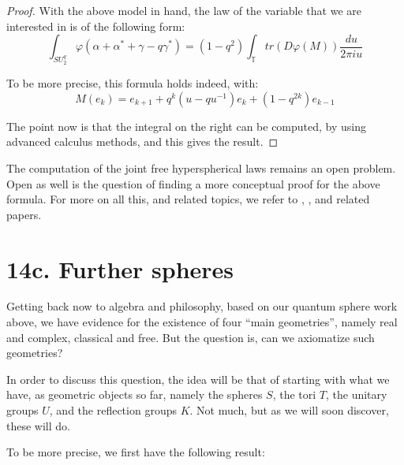 \documentclass[12pt]{amsbook}
\begin{document}
\begin{proof}
With the above model in hand, the law of the variable that we are interested in is of the following form:
$$\int_{SU^q_2}\varphi(\alpha+\alpha^*+\gamma-q\gamma^*)=(1-q^2)\int_{\mathbb T}tr(D\varphi(M))\frac{du}{2\pi iu}$$

To be more precise, this formula holds indeed, with:
$$M(e_k)=e_{k+1}+q^k(u-qu^{-1})e_k+(1-q^{2k})e_{k-1}$$

The point now is that the integral on the right can be computed, by using advanced calculus methods, and this gives the result.
\end{proof}

The computation of the joint free hyperspherical laws remains an open problem. Open as well is the question of finding a more conceptual proof for the above formula. For more on all this, and related topics, we refer to \cite{bbs}, \cite{bco}, \cite{bgo} and related papers.

\section*{14c. Further spheres}

Getting back now to algebra and philosophy, based on our quantum sphere work above, we have evidence for the existence of four ``main geometries'', namely real and complex, classical and free. But the question is, can we axiomatize such geometries?

\bigskip

In order to discuss this question, the idea will be that of starting with what we have, as geometric objects so far, namely the spheres $S$, the tori $T$, the unitary groups $U$, and the reflection groups $K$. Not much, but as we will soon discover, these will do.

\bigskip

To be more precise, we first have the following result:
\end{document}

